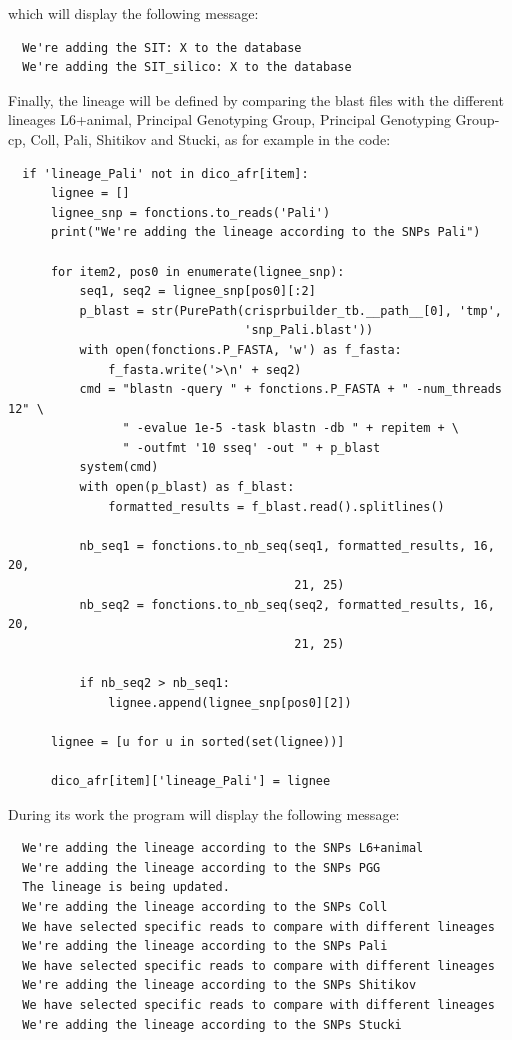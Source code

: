 \documentclass[twoside,a4paper,11pt,frenchb,openany]{report}
\begin{document}
    which will display the following message:

    \begin{verbatim}
  We're adding the SIT: X to the database
  We're adding the SIT_silico: X to the database
\end{verbatim}

    Finally, the lineage will be defined by comparing the blast files with
the different lineages L6+animal, Principal Genotyping Group, Principal
Genotyping Group-cp, Coll, Pali, Shitikov and Stucki, as for example in
the code:

\begin{verbatim}
  if 'lineage_Pali' not in dico_afr[item]:
      lignee = []
      lignee_snp = fonctions.to_reads('Pali')
      print("We're adding the lineage according to the SNPs Pali")

      for item2, pos0 in enumerate(lignee_snp):
          seq1, seq2 = lignee_snp[pos0][:2]
          p_blast = str(PurePath(crisprbuilder_tb.__path__[0], 'tmp',
                                 'snp_Pali.blast'))
          with open(fonctions.P_FASTA, 'w') as f_fasta:
              f_fasta.write('>\n' + seq2)
          cmd = "blastn -query " + fonctions.P_FASTA + " -num_threads 12" \
                " -evalue 1e-5 -task blastn -db " + repitem + \
                " -outfmt '10 sseq' -out " + p_blast
          system(cmd)
          with open(p_blast) as f_blast:
              formatted_results = f_blast.read().splitlines()

          nb_seq1 = fonctions.to_nb_seq(seq1, formatted_results, 16, 20,
                                        21, 25)
          nb_seq2 = fonctions.to_nb_seq(seq2, formatted_results, 16, 20,
                                        21, 25)

          if nb_seq2 > nb_seq1:
              lignee.append(lignee_snp[pos0][2])

      lignee = [u for u in sorted(set(lignee))]

      dico_afr[item]['lineage_Pali'] = lignee
\end{verbatim}

    During its work the program will display the following message:

    \begin{verbatim}
  We're adding the lineage according to the SNPs L6+animal
  We're adding the lineage according to the SNPs PGG
  The lineage is being updated.
  We're adding the lineage according to the SNPs Coll
  We have selected specific reads to compare with different lineages
  We're adding the lineage according to the SNPs Pali
  We have selected specific reads to compare with different lineages
  We're adding the lineage according to the SNPs Shitikov
  We have selected specific reads to compare with different lineages
  We're adding the lineage according to the SNPs Stucki
\end{verbatim}
\end{document}
